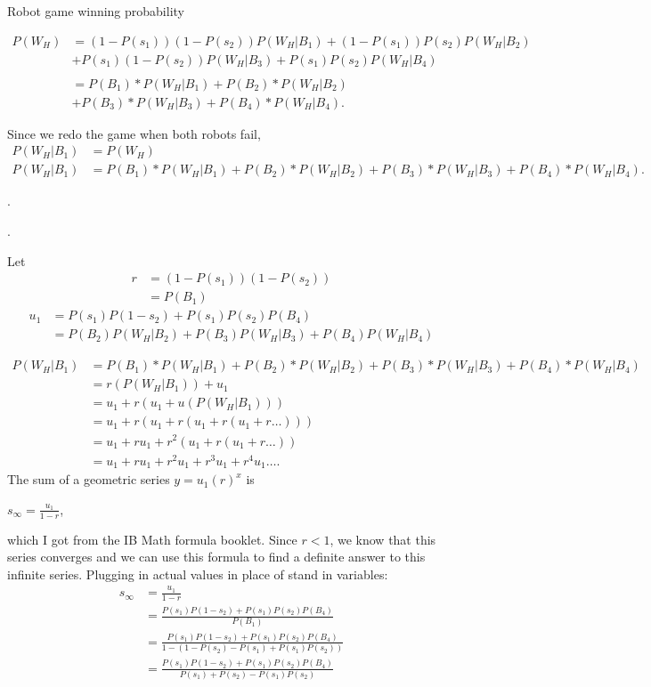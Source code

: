 \documentclass[11pt]{article}
\begin{document}
Robot game winning probability


\begin{align*}
    P(W_{H})&= (1-P(s_1))(1-P(s_2))P(W_H | B_1) + (1-P(s_1))P(s_2)P(W_H | B_2)\\
    &+ P(s_1)(1-P(s_2))P(W_H | B_3) + P(s_1)P(s_2)P(W_H | B_4)\\
    \\
    &= P(B_{1}) * P(W_{H} | B_{1}) + P(B_{2}) * P(W_{H} | B_{2}) \\
    &+ P(B_{3}) * P(W_{H} | B_{3}) + P(B_{4}) * P(W_{H} | B_{4}).
\end{align*}

Since we redo the game when both robots fail, 
\begin{align*}
    P(W_H | B_1) &= P(W_{H})\\
    P(W_H | B_1) &= P(B_{1}) * P(W_{H} | B_{1}) + P(B_{2}) * P(W_{H} | B_{2}) + P(B_{3}) * P(W_{H} | B_{3}) + P(B_{4}) * P(W_{H} | B_{4}).
\end{align*}

.

.


Let
\begin{align*}
    r &= (1-P(s_1))(1-P(s_2))\\
    &= P(B_1)
\end{align*}
\begin{align*}
    u_1 &= P(s_1)P(1-s_2) + P(s_1)P(s_2)P(B_4)\\
    &= P(B_2)P(W_H | B_2) + P(B_3)P(W_H | B_3) + P(B_4)P(W_H | B_4)
\end{align*}



\begin{align*}
    P(W_H | B_1) &= P(B_{1}) * P(W_{H} | B_{1}) + P(B_{2}) * P(W_{H} | B_{2}) + P(B_{3}) * P(W_{H} | B_{3}) + P(B_{4}) * P(W_{H} | B_{4})\\
    &= r(P(W_{H} | B_1)) + u_1\\
    &= u_1 + r(u_1 + u(P(W_{H} | B_1)))\\
    &= u_1 + r(u_1 + r(u_1 + r(u_1 + r\dots)))\\
    &= u_1 + ru_1 + r^2(u_1 + r(u_1 + r\dots))\\
    &= u_1 + ru_1 + r^2 u_1 + r^3 u_1 + r^4 u_1\dots.
\end{align*}
The sum of a geometric series \(y = u_1 (r)^x \) is

\(s_{\infty} = \frac{u_1}{1-r}\),

which I got from the IB Math formula booklet. Since \(r < 1 \), we know that this
series converges and we can use this formula to find a definite answer to this infinite series.
Plugging in actual values in place of stand in variables:
\begin{align*}
    s_{\infty} &= \frac{u_1}{1-r}\\
    &= \frac{P(s_1)P(1-s_2) + P(s_1)P(s_2)P(B_4)}{P(B_1)}\\
    &= \frac{P(s_1)P(1-s_2) + P(s_1)P(s_2)P(B_4)}{1-(1 - P(s_2) - P(s_1) + P(s_1) P(s_2))}\\
    &= \frac{P(s_1)P(1-s_2) + P(s_1)P(s_2)P(B_4)}{P(s_1) + P(s_2) - P(s_1) P(s_2)}
\end{align*}
\end{document}
